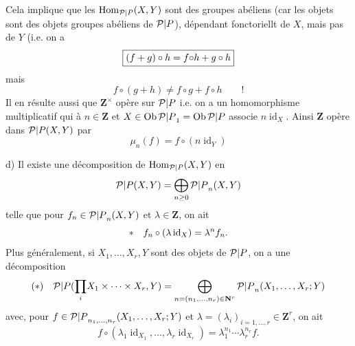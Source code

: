 Cela implique que 
les $\operatorname{Hom}_{\mathcal P|P}(X,Y)$ sont des groupes abéliens (car les objets   sont des objets groupes abéliens de ${\mathcal P|P}$), dépendant fonctoriellt de $X$, mais pas de $Y$ (i.e. on a
\[
\boxed{(f+g)\circ h=f{\circ}h+g\circ h}
\]
mais   
\[
f\circ(g+h)\ne f\circ g+f\circ h\qquad !
\]
Il en résulte aussi que $\mathbf Z^\times$ opère sur ${\mathcal P|P}$ i.e. on a un homomorphisme multiplicatif
qui à $n\in\mathbf Z$ et $X\in\operatorname{Ob}{\mathcal P|P}_1=\operatorname{Ob}{\mathcal P|P}$ associe $n\operatorname{id}_X$.
Ainsi $\mathbf Z$ opère dans  ${\mathcal P|P}(X,Y)$ par
\[
\mu_n(f)=f\circ(n\operatorname{id}_Y)
\]

d) Il existe une décomposition de $\operatorname{Hom}_{\mathcal P|P}(X,Y)$ en
\[
{\mathcal P|P}(X,Y)=\bigoplus_{n\geq0}{\mathcal P|P}_n(X,Y)
\]
telle que pour $f_n\in {\mathcal P|P}_n(X,Y)$ et $\lambda\in\mathbf Z$, on ait
\[
{*}\quad f_n\circ(\lambda\operatorname{id}_X)=\lambda^n f_n.
\]
Plus généralement, si $X_1,\ldots,X_r,Y$ sont des objets de ${\mathcal P|P}$, on a une décomposition
\[
(*)\quad {\mathcal P|P}({\prod_i}X_1\times\cdots\times X_r,Y)=\bigoplus_{n=(n_1,\ldots,n_r)\in\mathbf N^r}{\mathcal P|P}_n(X_1,\ldots,X_r;Y)
\]
avec, pour $f\in {\mathcal P|P}_{n_1,\ldots,n_r}(X_1,\ldots,X_r;Y)$ et $\lambda=(\lambda_i)_{i=1,\ldots,r}\in\mathbf Z^r$, on ait
\[
f\circ(\lambda_1\operatorname{id}_{X_1},\ldots,\lambda_r\operatorname{id}_{X_r})=\lambda_1^{n_1}\cdots\lambda_r^{n_r}f.
\]


